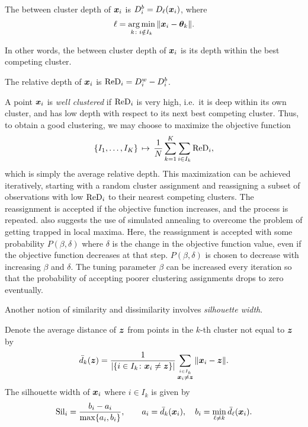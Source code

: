 \begin{definition}
    The between cluster depth of $\bm{x}_i$ is $D_i^b = D_\ell(\bm{x}_i)$, where
    \begin{equation}
        \ell = \operatorname*{arg\,min}_{k \colon i \notin I_k} \Vert \bm{x}_i - \bm{\theta}_k \Vert.
    \end{equation}
\end{definition}

In other words, the between cluster depth of $\bm{x}_i$ is its depth within the
best competing cluster.

\begin{definition}
    The relative depth of $\bm{x}_i$ is $\operatorname{ReD}_i = D_i^w - D_i^b$.
\end{definition}

A point $\bm{x}_i$ is \emph{well clustered} if $\operatorname{ReD}_i$ is very high, i.e.\ it is
deep within its own cluster, and has low depth with respect to its next best
competing cluster.
Thus, to obtain a good clustering, we may choose to maximize the objective
function
\begin{equation}
    \{I_1, \dots, I_K\} \,\mapsto\, \frac{1}{N} \sum_{k = 1}^K \sum_{i \in I_k} \operatorname{ReD}_i,
\end{equation}
which is simply the average relative depth.
This maximization can be achieved iteratively, starting with a random cluster
assignment and reassigning a subset of observations with low $\operatorname{ReD}_i$ to their
nearest competing clusters.
The reassignment is accepted if the objective function increases, and the
process is repeated.
\textcite{jornsten-2004} also suggests the use of simulated annealing to
overcome the problem of getting trapped in local maxima.
Here, the reassignment is accepted with some probability $P(\beta, \delta)$
where $\delta$ is the change in the objective function value, even if the
objective function decreases at that step.
$P(\beta, \delta)$ is chosen to decrease with increasing $\beta$ and $\delta$.
The tuning parameter $\beta$ can be increased every iteration so that the
probability of accepting poorer clustering assignments drops to zero
eventually.

Another notion of similarity and dissimilarity involves \emph{silhouette
width}.

\begin{definition}
    Denote the average distance of $\bm{z}$ from points in the $k$-th cluster not
    equal to $\bm{z}$ by
    \begin{equation}
        \bar{d}_k(\bm{z}) = \frac{1}{|\{i \in I_k\colon \bm{x}_i \neq \bm{z}\}|} \sum_{\stackrel{i \in I_k}{\bm{x}_i \neq \bm{z}}} \Vert \bm{x}_i - \bm{z} \Vert.
    \end{equation}
    The silhouette width of $\bm{x}_i$ where $i \in I_k$ is given by
    \begin{equation}
        \operatorname{Sil}_i = \frac{b_i - a_i}{\max\{a_i, b_i\}}, \qquad
        a_i = \bar{d}_k(\bm{x}_i), \quad
        b_i = \min_{\ell \neq k} \bar{d}_\ell(\bm{x}_i).
    \end{equation}
\end{definition}

